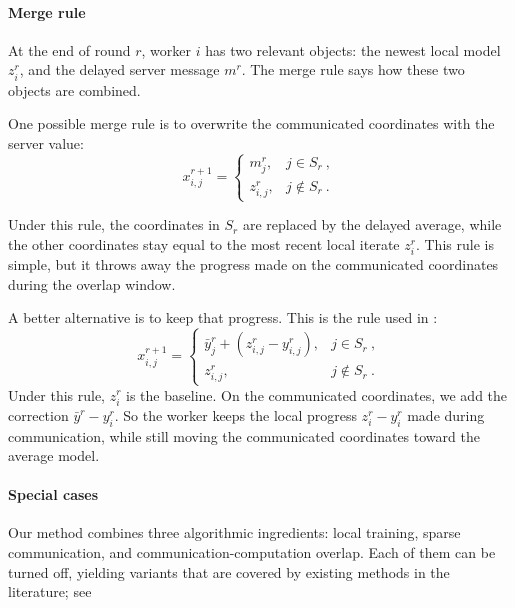\documentclass{article}
\theoremstyle{plain}
\theoremstyle{definition}
\begin{document}
\paragraph{Merge rule}\label{par:merge_rules}
% 
At the end of round \(r\), worker \(i\) has two relevant objects:
the newest local model \(z_i^r\), and the delayed server message \(m^r\).
The merge rule says how these two objects are combined.

One possible merge rule is to overwrite the communicated coordinates with the server value:
\begin{equation*}%
    x_{i,j}^{r+1}
    =   \begin{cases}
            m_j^r, & j \in S_r ~, \\
            z_{i,j}^r, & j \notin S_r ~.
        \end{cases}
\end{equation*}

Under this rule, the coordinates in \(S_r\) are replaced by the delayed average, while the other coordinates stay equal to the most recent local iterate \(z_i^r\).
This rule is simple, but it throws away the progress made on the communicated coordinates during the overlap window.

A better alternative is to keep that progress.
This is the rule used in :
\begin{equation*}%
    x_{i,j}^{r+1}
    =
    \begin{cases}
        \bar y_j^r + (z_{i,j}^r-y_{i,j}^r), & j\in S_r ~,\\
        z_{i,j}^r, & j\notin S_r ~.
    \end{cases}    
\end{equation*}
% 
Under this rule, \(z_i^r\) is the baseline.
On the communicated coordinates, we add the correction \(\bar y^r-y_i^r\).
So the worker keeps the local progress \(z_i^r-y_i^r\) made during communication, while still moving the communicated coordinates toward the average model.
% 
\paragraph{Special cases} \label{par:special_cases}
% 
Our method combines three algorithmic ingredients:
local training, sparse communication, and communication-computation overlap.
Each of them can be turned off, yielding variants that are covered by existing methods in the literature; see 
\end{document}
